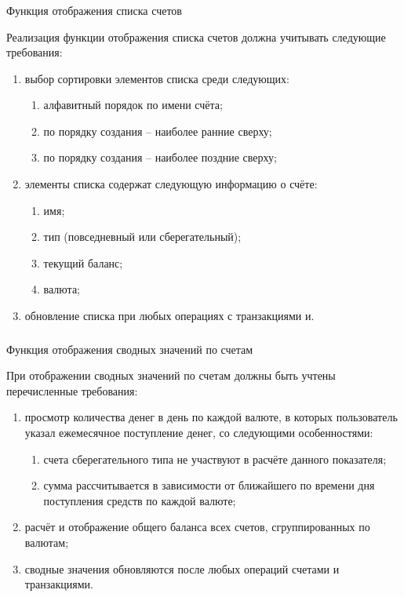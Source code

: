 \subsubsection{} Функция отображения списка счетов
\label{sec:domain:specification:wallets_list}

Реализация функции отображения списка счетов должна учитывать следующие требования:

\begin{enumerate}
    \item выбор сортировки элементов списка среди следующих:
    \begin{enumerate}
        \item алфавитный порядок по имени счёта;
        \item по порядку создания -- наиболее ранние сверху;
        \item по порядку создания -- наиболее поздние сверху;
    \end{enumerate}
    \item элементы списка содержат следующую информацию о счёте:
    \begin{enumerate}
        \item имя;
        \item тип (повседневный или сберегательный);
        \item текущий баланс;
        \item валюта;
    \end{enumerate}
    \item обновление списка при любых операциях с транзакциями и.
\end{enumerate}

\subsubsection{} Функция отображения сводных значений по счетам
\label{sec:domain:specification:wallets_stats}

При отображении сводных значений по счетам должны быть учтены перечисленные требования:

\begin{enumerate}
    \item просмотр количества денег в день по каждой валюте, в которых пользователь указал ежемесячное поступление денег, со следующими особенностями:
    \begin{enumerate}
        \item счета сберегательного типа не участвуют в расчёте данного показателя;
        \item сумма рассчитывается в зависимости от ближайшего по времени дня поступления средств по каждой валюте;
    \end{enumerate}
    \item расчёт и отображение общего баланса всех счетов, сгруппированных по валютам;
    \item сводные значения обновляются после любых операций счетами и транзакциями.
\end{enumerate}

